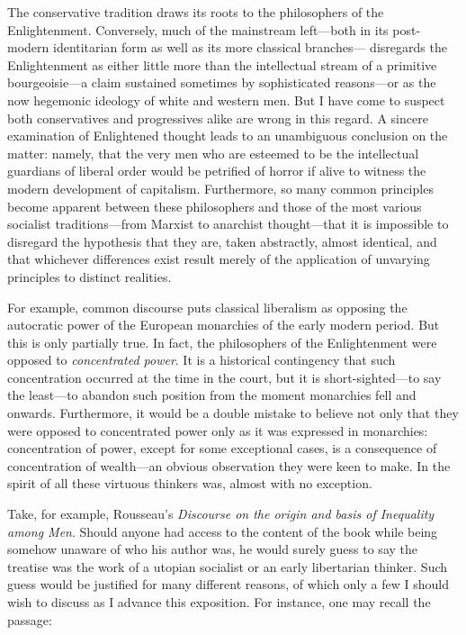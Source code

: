 \documentclass[a4paper]{article}
\begin{document}
The conservative tradition draws its roots to the philosophers of the
Enlightenment. Conversely, much of the mainstream left---both in its post-modern
identitarian form as well as its more classical branches--- disregards the
Enlightenment as either little more than the intellectual stream of a primitive
bourgeoisie---a claim sustained sometimes by sophisticated reasons---or as the
now hegemonic ideology of white and western men. But I have come to suspect both
conservatives and progressives alike are wrong in this regard. A sincere
examination of Enlightened thought leads to an unambiguous conclusion on the
matter: namely, that the very men who are esteemed to be the intellectual
guardians of liberal order would be petrified of horror if alive to witness the
modern development of capitalism. Furthermore, so many common principles become
apparent between these philosophers and those of the most various socialist
traditions---from Marxist to anarchist thought---that it is impossible to
disregard the hypothesis that they are, taken abstractly, almost identical, and
that whichever differences exist result merely of the application of unvarying
principles to distinct realities.

For example, common discourse puts classical liberalism as opposing the
autocratic power of the European monarchies of the early modern period. But this
is only partially true. In fact, the philosophers of the Enlightenment were
opposed to \textit{concentrated power}. It is a historical contingency that such
concentration occurred at the time in the court, but it is short-sighted---to
say the least---to abandon such position from the moment monarchies fell and
onwards. Furthermore, it would be a double mistake to believe not only that they
were opposed to concentrated power only as it was expressed in monarchies:
concentration of power, except for some exceptional cases, is a consequence of
concentration of wealth---an obvious observation they were keen to make. In the
spirit of all these virtuous thinkers was, almost with no exception.

Take, for example, Rousseau's \textit{Discourse on the origin and basis of
Inequality among Men}. Should anyone had access to the content of the book while
being somehow unaware of who his author was, he would surely guess to say the treatise
was the work of a utopian socialist or an early libertarian thinker. Such guess
would be justified for many different reasons, of which only a few I should wish
to discuss as I advance this exposition. For instance, one may recall the
passage:
\end{document}
